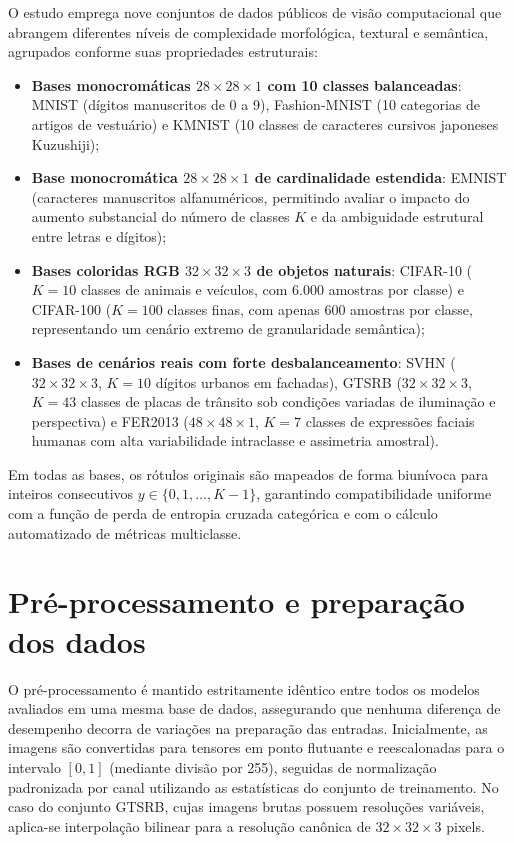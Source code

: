 \documentclass[
    12pt,
    openright,
    oneside,
    a4paper,
    english,
    brazil
]{abntex2}
\begin{document}
O estudo emprega nove conjuntos de dados públicos de visão computacional que abrangem diferentes níveis de complexidade morfológica, textural e semântica, agrupados conforme suas propriedades estruturais:
\begin{itemize}
    \item \textbf{Bases monocromáticas \(28 \times 28 \times 1\) com 10 classes balanceadas}: MNIST (dígitos manuscritos de 0 a 9), Fashion-MNIST (10 categorias de artigos de vestuário) e KMNIST (10 classes de caracteres cursivos japoneses Kuzushiji);
    \item \textbf{Base monocromática \(28 \times 28 \times 1\) de cardinalidade estendida}: EMNIST (caracteres manuscritos alfanuméricos, permitindo avaliar o impacto do aumento substancial do número de classes \(K\) e da ambiguidade estrutural entre letras e dígitos);
    \item \textbf{Bases coloridas RGB \(32 \times 32 \times 3\) de objetos naturais}: CIFAR-10 (\(K=10\) classes de animais e veículos, com 6.000 amostras por classe) e CIFAR-100 (\(K=100\) classes finas, com apenas 600 amostras por classe, representando um cenário extremo de granularidade semântica);
    \item \textbf{Bases de cenários reais com forte desbalanceamento}: SVHN (\(32 \times 32 \times 3\), \(K=10\) dígitos urbanos em fachadas), GTSRB (\(32 \times 32 \times 3\), \(K=43\) classes de placas de trânsito sob condições variadas de iluminação e perspectiva) e FER2013 (\(48 \times 48 \times 1\), \(K=7\) classes de expressões faciais humanas com alta variabilidade intraclasse e assimetria amostral).
\end{itemize}

Em todas as bases, os rótulos originais são mapeados de forma biunívoca para inteiros consecutivos \(y \in \{0, 1, \dots, K-1\}\), garantindo compatibilidade uniforme com a função de perda de entropia cruzada categórica e com o cálculo automatizado de métricas multiclasse.

\section{Pré-processamento e preparação dos dados}

O pré-processamento é mantido estritamente idêntico entre todos os modelos avaliados em uma mesma base de dados, assegurando que nenhuma diferença de desempenho decorra de variações na preparação das entradas. Inicialmente, as imagens são convertidas para tensores em ponto flutuante e reescalonadas para o intervalo \([0, 1]\) (mediante divisão por 255), seguidas de normalização padronizada por canal utilizando as estatísticas do conjunto de treinamento. No caso do conjunto GTSRB, cujas imagens brutas possuem resoluções variáveis, aplica-se interpolação bilinear para a resolução canônica de \(32 \times 32 \times 3\) pixels.
\end{document}
